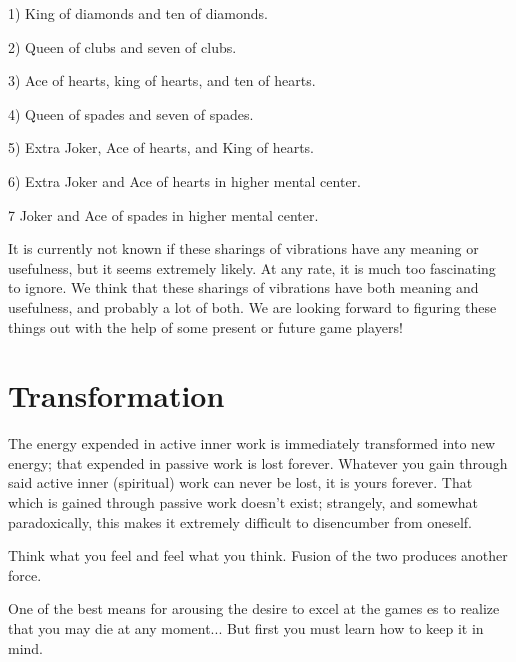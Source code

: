 \documentclass[12pt,letterpaper]{book}
\begin{document}
1) King of diamonds and ten of diamonds.

2) Queen of clubs and seven of clubs.

3) Ace of hearts, king of hearts, and ten of hearts.

4) Queen of spades and seven of spades.

5) Extra Joker, Ace of hearts, and King of hearts.

6) Extra Joker and Ace of hearts in higher mental center.

7 Joker and Ace of spades in higher mental center.

It is currently not known if these sharings of vibrations have any meaning or usefulness, but it seems extremely likely. At any rate, it is much too fascinating to ignore. We think that these sharings of vibrations have both meaning and usefulness, and probably a lot of both. We are looking forward to figuring these things out with the help of some present or future game players!



\chapter{Transformation}

The energy expended in active inner work is immediately transformed into new energy; that expended in passive work is lost forever. Whatever you gain through said active inner (spiritual) work can never be lost, it is yours forever. That which is gained through passive work doesn't exist; strangely, and somewhat paradoxically, this makes it extremely difficult to disencumber from oneself.

Think what you feel and feel what you think. Fusion of the two produces another force.

One of the best means for arousing the desire to excel at the games es to realize that you may die at any moment... But first you must learn how to keep it in mind.
\end{document}
